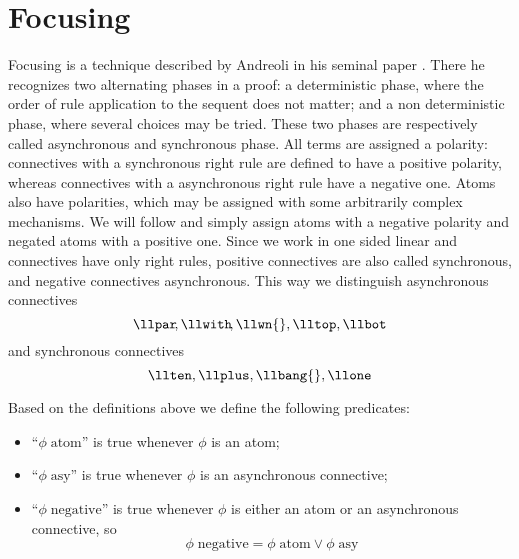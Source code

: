 \section{Focusing}
Focusing is a technique described by Andreoli in his seminal paper \cite{Focusing}.
There he recognizes two alternating phases in a proof: a deterministic phase, where the order of rule application to the sequent does not matter; and a non deterministic phase, where several choices may be tried.
These two phases are respectively called asynchronous and synchronous phase.
All terms are assigned a polarity: connectives with a synchronous right rule are defined to have a positive polarity, whereas connectives with a asynchronous right rule have a negative one.
Atoms also have polarities, which may be assigned with some arbitrarily complex mechanisms.
We will follow \cite{LiangMiller} and simply assign atoms with a negative polarity and negated atoms with a positive one.
Since we work in one sided linear and connectives have only right rules, positive connectives are also called synchronous, and negative connectives asynchronous.
This way we distinguish asynchronous connectives
	$$ \llpar\!, \llwith\!, \llwn{}, \lltop, \llbot $$
and synchronous connectives
	$$ \llten, \llplus, \llbang{}, \llone $$
\begin{define}
	Based on the definitions above we define the following predicates:
	\begin{itemize}
		\item ``$\phi \; \mathrm{atom}$'' is true whenever $\phi$ is an atom;
		\item ``$\phi \; \mathrm{asy}$'' is true whenever $\phi$ is an asynchronous connective;
		\item ``$\phi \; \mathrm{negative}$'' is true whenever $\phi$ is either an atom or an asynchronous connective, so
			$$ \phi \; \mathrm{negative} = \phi \; \mathrm{atom} \vee \phi \; \mathrm{asy} $$
	\end{itemize}
\end{define}

